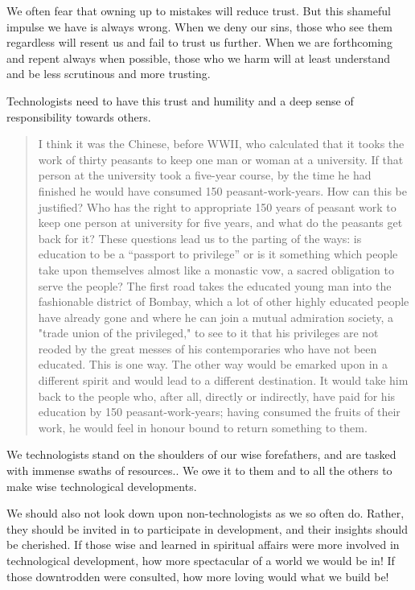 \documentclass[letterpaper]{article}
\begin{document}
    We often fear that owning up to mistakes will reduce trust. But this shameful impulse we have is always wrong. When we deny our sins, those who see them regardless will resent us and fail to trust us further. When we are forthcoming and repent always when possible, those who we harm will at least understand and be less scrutinous and more trusting.

    Technologists need to have this trust and humility and a deep sense of responsibility towards others.

    \begin{quote}
      I think it was the Chinese, before WWII, who calculated that it tooks the work of thirty peasants to keep one man or woman at a university. If that person at the university took a five-year course, by the time he had finished he would have consumed 150 peasant-work-years. How can this be justified? Who has the right to appropriate 150 years of peasant work to keep one person at university for five years, and what do the peasants get back for it? These questions lead us to the parting of the ways: is education to be a ``passport to privilege'' or is it something which people take upon themselves almost like a monastic vow, a sacred obligation to serve the people? The first road takes the educated young man into the fashionable district of Bombay, which a lot of other highly educated people have already gone and where he can join a mutual admiration society, a "trade union of the privileged," to see to it that his privileges are not reoded by the great messes of his contemporaries who have not been educated. This is one way. The other way would be emarked upon in a different spirit and would lead to a different destination. It would take him back to the people who, after all, directly or indirectly, have paid for his education by 150 peasant-work-years; having consumed the fruits of their work, he would feel in honour bound to return something to them.
    \end{quote}

    We technologists stand on the shoulders of our wise forefathers, and are tasked with immense swaths of resources.. We owe it to them and to all the others to make wise technological developments.

    We should also not look down upon non-technologists as we so often do. Rather, they should be invited in to participate in development, and their insights should be cherished. If those wise and learned in spiritual affairs were more involved in technological development, how more spectacular of a world we would be in! If those downtrodden were consulted, how more loving would what we build be!
\end{document}
